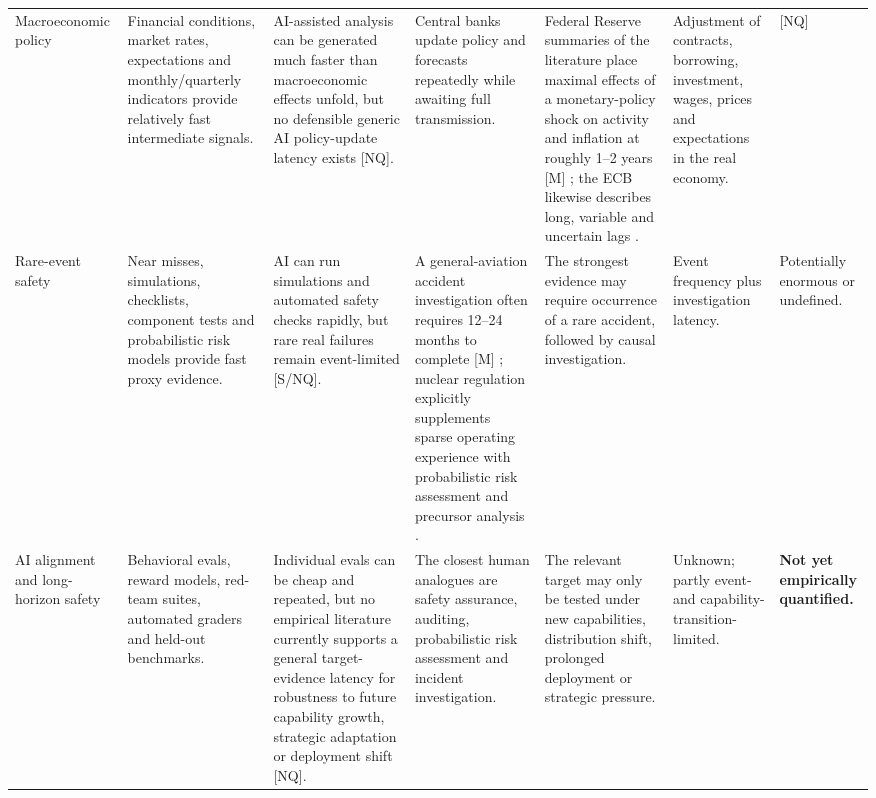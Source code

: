 \begin{landscape}
\begin{center}
\begin{longtable}{
    @{}
    p{2.0cm}
    p{3.0cm}
    p{2.85cm}
    p{2.75cm}
    p{3.05cm}
    p{2.75cm}
    p{2.55cm}
    @{}
}
Macroeconomic policy
&
Financial conditions, market rates, expectations and monthly/quarterly
indicators provide relatively fast intermediate signals.
&
AI-assisted analysis can be generated much faster than macroeconomic
effects unfold, but no defensible generic AI policy-update latency
exists [NQ].
&
Central banks update policy and forecasts repeatedly while awaiting
full transmission.
&
Federal Reserve summaries of the literature place maximal effects of a
monetary-policy shock on activity and inflation at roughly 1--2 years
[M] \parencite{kugler2025transmission}; the ECB likewise describes long,
variable and uncertain lags \parencite{ecbTransmission}.
&
Adjustment of contracts, borrowing, investment, wages, prices and
expectations in the real economy.
&
[NQ]

\\[3pt]

Rare-event safety
&
Near misses, simulations, checklists, component tests and probabilistic
risk models provide fast proxy evidence.
&
AI can run simulations and automated safety checks rapidly, but rare
real failures remain event-limited [S/NQ].
&
A general-aviation accident investigation often requires 12--24 months
to complete [M] \parencite{ntsbInvestigation}; nuclear regulation explicitly
supplements sparse operating experience with probabilistic risk
assessment and precursor analysis
\parencite{nrcASP,nrcPRA}.
&
The strongest evidence may require occurrence of a rare accident,
followed by causal investigation.
&
Event frequency plus investigation latency.
&
Potentially enormous or undefined.

\\[3pt]

AI alignment and long-horizon safety
&
Behavioral evals, reward models, red-team suites, automated graders and
held-out benchmarks.
&
Individual evals can be cheap and repeated, but no empirical literature
currently supports a general target-evidence latency for robustness to
future capability growth, strategic adaptation or deployment shift [NQ].
&
The closest human analogues are safety assurance, auditing,
probabilistic risk assessment and incident investigation.
&
The relevant target may only be tested under new capabilities,
distribution shift, prolonged deployment or strategic pressure.
&
Unknown; partly event- and capability-transition-limited.
&
\textbf{Not yet empirically quantified.}

\end{longtable}
\end{center}
\end{landscape}
